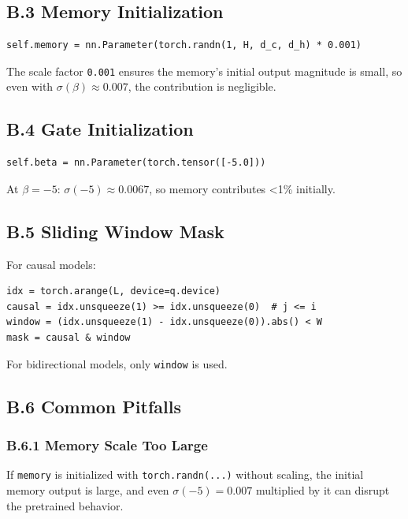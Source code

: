 \subsection{B.3 Memory Initialization}

\begin{lstlisting}
self.memory = nn.Parameter(torch.randn(1, H, d_c, d_h) * 0.001)
\end{lstlisting}

The scale factor \texttt{0.001} ensures the memory's initial output magnitude is 
small, so even with $\sigma(\beta) \approx 0.007$, the contribution is 
negligible.

\subsection{B.4 Gate Initialization}

\begin{lstlisting}
self.beta = nn.Parameter(torch.tensor([-5.0]))
\end{lstlisting}

At $\beta = -5$: $\sigma(-5) \approx 0.0067$, so memory contributes <1\% 
initially.

\subsection{B.5 Sliding Window Mask}

For causal models:

\begin{lstlisting}
idx = torch.arange(L, device=q.device)
causal = idx.unsqueeze(1) >= idx.unsqueeze(0)  # j <= i
window = (idx.unsqueeze(1) - idx.unsqueeze(0)).abs() < W
mask = causal & window
\end{lstlisting}

For bidirectional models, only \texttt{window} is used.

\subsection{B.6 Common Pitfalls}

\subsubsection{B.6.1 Memory Scale Too Large}

If \texttt{memory} is initialized with \texttt{torch.randn(...)} without scaling, the 
initial memory output is large, and even $\sigma(-5) = 0.007$ multiplied by 
it can disrupt the pretrained behavior.

